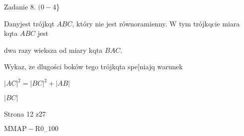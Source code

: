 \documentclass[a4paper,12pt]{article}
\begin{document}
Zadanie 8. $(0-4$\}

Danyjest trójkqt $ABC$, który nie jest równoramienny. $\mathrm{W}$ tym trójkqcie miara kqta $ABC$ jest

dwa razy wieksza od miary kqta $BAC.$

Wykaz, $\dot{\mathrm{z}}\mathrm{e}$ dlugości boków tego trójkqta spe[niajq warunek

$|AC|^{2}=|BC|^{2}+|AB|$

$|BC|$

Strona 12 z27

$\mathrm{M}\mathrm{M}\mathrm{A}\mathrm{P}-\mathrm{R}0_{-}100$
\end{document}

